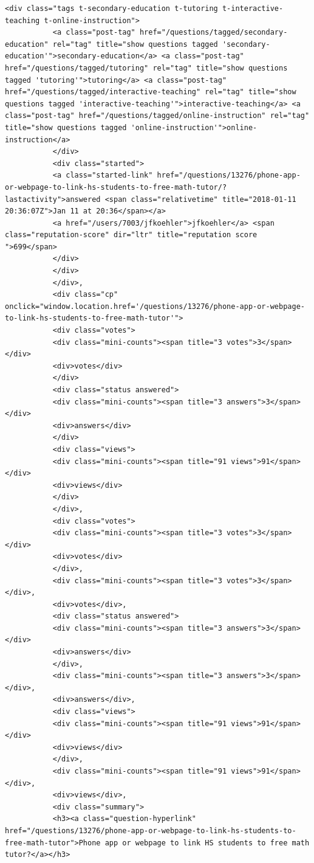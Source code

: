 \documentclass[11pt]{article}
\begin{document}
\begin{Verbatim}[commandchars=\\\{\}]
           <div class="tags t-secondary-education t-tutoring t-interactive-teaching t-online-instruction">
           <a class="post-tag" href="/questions/tagged/secondary-education" rel="tag" title="show questions tagged 'secondary-education'">secondary-education</a> <a class="post-tag" href="/questions/tagged/tutoring" rel="tag" title="show questions tagged 'tutoring'">tutoring</a> <a class="post-tag" href="/questions/tagged/interactive-teaching" rel="tag" title="show questions tagged 'interactive-teaching'">interactive-teaching</a> <a class="post-tag" href="/questions/tagged/online-instruction" rel="tag" title="show questions tagged 'online-instruction'">online-instruction</a>
           </div>
           <div class="started">
           <a class="started-link" href="/questions/13276/phone-app-or-webpage-to-link-hs-students-to-free-math-tutor/?lastactivity">answered <span class="relativetime" title="2018-01-11 20:36:07Z">Jan 11 at 20:36</span></a>
           <a href="/users/7003/jfkoehler">jfkoehler</a> <span class="reputation-score" dir="ltr" title="reputation score ">699</span>
           </div>
           </div>
           </div>,
           <div class="cp" onclick="window.location.href='/questions/13276/phone-app-or-webpage-to-link-hs-students-to-free-math-tutor'">
           <div class="votes">
           <div class="mini-counts"><span title="3 votes">3</span></div>
           <div>votes</div>
           </div>
           <div class="status answered">
           <div class="mini-counts"><span title="3 answers">3</span></div>
           <div>answers</div>
           </div>
           <div class="views">
           <div class="mini-counts"><span title="91 views">91</span></div>
           <div>views</div>
           </div>
           </div>,
           <div class="votes">
           <div class="mini-counts"><span title="3 votes">3</span></div>
           <div>votes</div>
           </div>,
           <div class="mini-counts"><span title="3 votes">3</span></div>,
           <div>votes</div>,
           <div class="status answered">
           <div class="mini-counts"><span title="3 answers">3</span></div>
           <div>answers</div>
           </div>,
           <div class="mini-counts"><span title="3 answers">3</span></div>,
           <div>answers</div>,
           <div class="views">
           <div class="mini-counts"><span title="91 views">91</span></div>
           <div>views</div>
           </div>,
           <div class="mini-counts"><span title="91 views">91</span></div>,
           <div>views</div>,
           <div class="summary">
           <h3><a class="question-hyperlink" href="/questions/13276/phone-app-or-webpage-to-link-hs-students-to-free-math-tutor">Phone app or webpage to link HS students to free math tutor?</a></h3>

\end{Verbatim}
\end{document}
